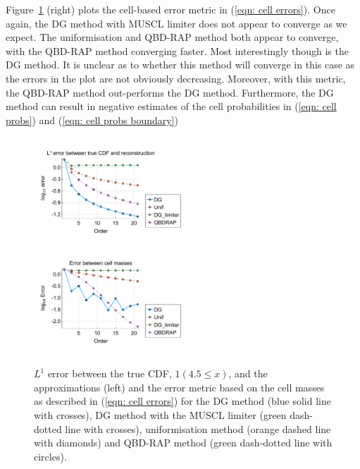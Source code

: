 \begin{example}
Figure~\ref{fig: fun 2 wave} (right) plots the cell-based error metric in (\ref{eqn: cell errors}). Once again, the DG method with MUSCL limiter does not appear to converge as we expect. The uniformisation and QBD-RAP method both appear to converge, with the QBD-RAP method converging faster. Most interestingly though is the DG method. It is unclear as to whether this method will converge in this case as the errors in the plot are not obviously decreasing. Moreover, with this metric, the QBD-RAP method out-performs the DG method. Furthermore, the DG method can result in negative estimates of the cell probabilities in (\ref{eqn: cell probs}) and (\ref{eqn: cell probs boundary})
\begin{figure}
	\centering
	\includegraphics[width=0.5\textwidth,trim={0.75cm 0.8cm 0.25cm 1.25cm},clip]{chapter6/figs/wave/fun2/meshs_l1_cdf_error_formatted.pdf}%
	\includegraphics[width=0.5\textwidth,trim={0.75cm 0.8cm 0.25cm 1.25cm},clip]{chapter6/figs/wave/fun2/L1_cell_probs.pdf}
	\caption{\(L^1\) error between the true CDF, \(1(4.5\leq x)\), and the approximations (left) and the error metric based on the cell masses as described in (\ref{eqn: cell errors}) for the DG method (blue solid line with crosses), DG method with the MUSCL limiter (green dash-dotted line with crosses), uniformisation method (orange dashed line with diamonds) and QBD-RAP method (green dash-dotted line with circles).} 
	\label{fig: fun 2 wave} 
\end{figure}
\end{example}

